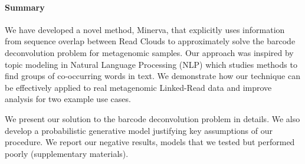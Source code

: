 
\paragraph{Summary}

We have developed a novel method, Minerva, that explicitly uses information from sequence overlap between Read Clouds to approximately solve the barcode deconvolution problem for metagenomic samples. Our approach was inspired by topic modeling in Natural Language Processing (NLP) which studies methods to find groups of co-occurring words in text. We demonstrate how our technique can be effectively applied to real metagenomic Linked-Read data  and improve analysis for two example use cases.

We present our solution to the barcode deconvolution problem in details. We also develop a probabilistic generative model justifying key assumptions of our procedure. We report our negative results, models that we tested but performed poorly (supplementary materials). 













